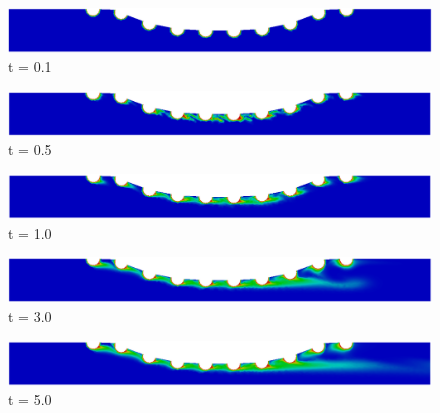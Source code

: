 \begin{figure}[H]
     \begin{minipage}{.50\linewidth}
      \centering
      \includegraphics[scale=0.18]{./02_chaps/cap_solution/figure/conc1000_CurvedStrut1.png}\\
      t = 0.1
     \end{minipage}%
     \begin{minipage}{.50\linewidth}
      \centering
      \includegraphics[scale=0.18]{./02_chaps/cap_solution/figure/conc1000_CurvedStrut2.png}\\
      t = 0.5
     \end{minipage}
     \begin{minipage}{.50\linewidth}
     \medskip
      \centering
      \includegraphics[scale=0.18]{./02_chaps/cap_solution/figure/conc1000_CurvedStrut3.png}\\
      t = 1.0
     \end{minipage}%
     \begin{minipage}{.50\linewidth}
     \medskip
      \centering
      \includegraphics[scale=0.18]{./02_chaps/cap_solution/figure/conc1000_CurvedStrut4.png}\\
      t = 3.0
     \end{minipage}
     \begin{minipage}{.50\linewidth}
      \centering
      \includegraphics[scale=0.18]{./02_chaps/cap_solution/figure/conc1000_CurvedStrut5.png}\\
      t = 5.0
     \end{minipage}%

\end{figure}
